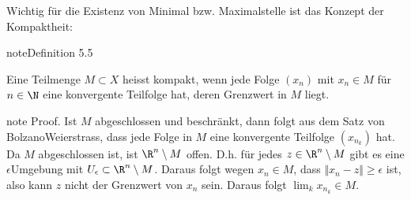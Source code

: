 \documentclass[letterpaper,10pt,english]{jupyterBook}
\begin{document}
Wichtig für die Existenz von Minimal\sphinxhyphen{} bzw. Maximalstelle ist das Konzept der Kompaktheit:
\label{stetigkeit/eigenschaften:definition-2}
\begin{sphinxadmonition}{note}{Definition 5.5}



Eine Teilmenge \(M \subset X\) heisst kompakt, wenn jede Folge \((x_n)\) mit \(x_n \in M\) für \(n \in \N\) eine konvergente Teilfolge hat, deren Grenzwert in \(M\) liegt.
\end{sphinxadmonition}

\begin{sphinxVerbatim}[commandchars=\\\{\}]

\end{sphinxVerbatim}

\begin{sphinxadmonition}{note}
Proof.  Ist \(M\) abgeschlossen und beschränkt, dann folgt aus dem Satz von Bolzano\sphinxhyphen{}Weierstrass, dass jede Folge in \(M\) eine konvergente Teilfolge \((x_{n_k})\) hat. Da \(M\) abgeschlossen ist, ist \(\R^n \setminus M\) offen. D.h. für jedes \(z \in \R^n \setminus M\) gibt es eine \(\epsilon\)\sphinxhyphen{}Umgebung mit \(U_\epsilon \subset \R^n \setminus M\). Daraus folgt wegen \(x_n \in M\), dass \(\Vert x_n - z \Vert \geq \epsilon\) ist, also kann \(z\) nicht der Grenzwert von \(x_n\) sein. Daraus folgt \(\lim_k x_{n_k} \in M\).

\begin{sphinxVerbatim}[commandchars=\\\{\}]

\end{sphinxVerbatim}
\end{sphinxadmonition}
\end{document}
